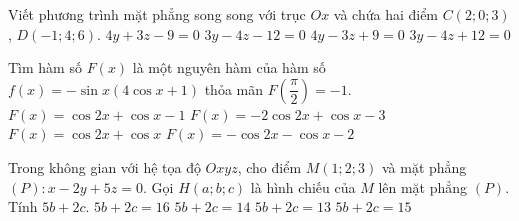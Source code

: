 \begin{ex}%
Viết phương trình mặt phẳng song song với trục $ Ox $	và chứa hai điểm $ C(2;0;3) $, $ D(-1;4;6) $. 
	\choice
	{$ 4y + 3z - 9 = 0 $}
	{$ 3y - 4z - 12 = 0 $}
	{$ 4y - 3z + 9 = 0 $}
	{\True $ 3y - 4z + 12 = 0 $}
\end{ex}	
\begin{ex}%
Tìm hàm số $ F(x) $	 là một nguyên hàm của hàm số $ f(x) = - \sin x (4 \cos x + 1) $ thỏa mãn $ F\left ( \dfrac{ \pi }{2} \right ) = - 1 $.
	\choice
	{$ F(x) = \cos 2x + \cos x - 1 $}
	{$ F(x) = -2\cos 2x + \cos x - 3 $}
	{\True $ F(x) = \cos 2x + \cos x  $}
	{$ F(x) = -\cos 2x - \cos x - 2 $}
\end{ex}	
\begin{ex}%
Trong không gian với hệ tọa độ $ Oxyz $, cho điểm $ M(1;2;3) $ và mặt phẳng $ (P) \colon x - 2y + 5z = 0 $. Gọi $ H(a;b;c) $ là hình chiếu của $ M $ lên mặt phẳng $ (P) $. Tính $ 5b + 2c $.	
	\choice
	{\True $ 5b + 2c = 16 $}
	{$ 5b + 2c = 14 $}
	{$ 5b + 2c = 13 $}
	{$ 5b + 2c = 15 $}
\end{ex}	
